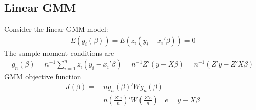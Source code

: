 \documentclass[a4paper,twoside,11pt]{article}
\begin{document}
\subsection{Linear GMM}
\begin{shaded*}
\noindent Consider the linear GMM model:
\begin{equation*}
\begin{aligned}
E(g_i(\beta)) = E(z_i (y_i - x_i' \beta)) =0 
\end{aligned} 
\end{equation*}
The sample moment conditions are
\begin{equation*}
\begin{aligned}
\bar g_n ( \beta) = n^{-1} \sum^n_{i=1} z_i (y_i -x_i' \beta) = n^{-1}Z' (y - X \beta) = n^{-1} (Z'y - Z'X\beta)
\end{aligned} 
\end{equation*}
GMM objective function
\begin{equation*}
\begin{aligned}
J(\beta) =& \ n \bar g_n (\beta)' W \bar g_n (\beta) \\
=& \ n (\frac{Z'e}{n})'W (\frac{Z'e}{n}) \ \ \ \ e = y- X\beta
\end{aligned} 
\end{equation*}
\end{shaded*}
\end{document}
